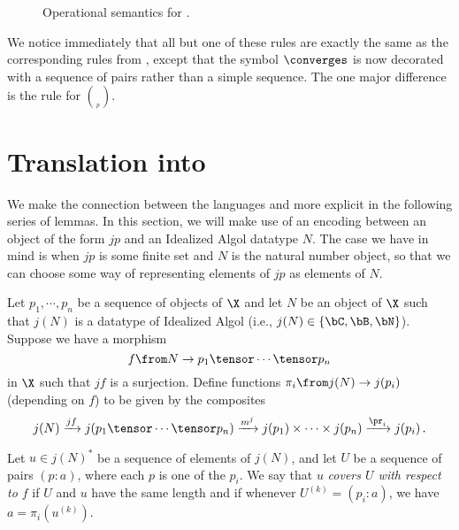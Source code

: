 \begin{figure}
  \caption[Operational semantics for \IAXX]{Operational semantics for \IAXX.}
  \label{FigIaxxOpSem}
  \normalsize
\end{figure}

We notice immediately that all but one of these rules are exactly the same as the corresponding rules from \IAX, except that the symbol $\converges$ is now decorated with a sequence of pairs rather than a simple sequence.
The one major difference is the rule for $\choose_p$.

\section{Translation into \IAX}

We make the connection between the languages \IAX and \IAXX more explicit in the following series of lemmas.
In this section, we will make use of an encoding between an object of the form $jp$ and an Idealized Algol datatype $N$.  
The case we have in mind is when $jp$ is some finite set and $N$ is the natural number object, so that we can choose some way of representing elements of $jp$ as elements of $N$.

\begin{definition}
  Let $p_1,\cdots,p_n$ be a sequence of objects of $\X$ and let $N$ be an object of $\X$ such that $j(N)$ is a datatype of Idealized Algol (i.e., $j(N)\in\{\bC,\bB,\bN\}$).  
  Suppose we have a morphism
  \[
    f \from N \to p_1 \tensor \cdots \tensor p_n
    \]
  in $\X$ such that $jf$ is a surjection.  
  Define functions $\pi_i\from j(N) \to j(p_i)$ (depending on $f$) to be given by the composites
  \[
    j(N) \xrightarrow{jf} j(p_1 \tensor \cdots \tensor p_n) \xrightarrow{m^j} j(p_1) \times \cdots \times j(p_n) \xrightarrow{\pr_i} j(p_i)\,.
    \]

  Let $u\in j(N)^*$ be a sequence of elements of $j(N)$, and let $U$ be a sequence of pairs $(p:a)$, where each $p$ is one of the $p_i$.  
  We say that $u$ \emph{covers $U$ with respect to $f$} if $U$ and $u$ have the same length and if whenever $U^{(k)}=(p_i:a)$, we have $a = \pi_i(u^{(k)})$.
  \label{DefCovers}
\end{definition}

